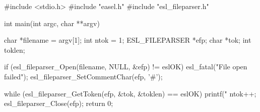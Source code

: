\begin{cchunk}
#include <stdio.h>
#include "easel.h"
#include "esl_fileparser.h"

int 
main(int argc, char **argv)
{
  char           *filename = argv[1];
  int             ntok     = 1;
  ESL_FILEPARSER *efp;
  char           *tok;
  int             toklen;

  if (esl_fileparser_Open(filename, NULL, &efp) != eslOK) esl_fatal("File open failed");
  esl_fileparser_SetCommentChar(efp, '#');
  
  while (esl_fileparser_GetToken(efp, &tok, &toklen) == eslOK) { 
    printf("%
    ntok++;  
  }
  esl_fileparser_Close(efp);
  return 0;
}
\end{cchunk}
